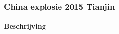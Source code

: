 \documentclass{article}
\begin{document}
	
	\subsubsection{China explosie 2015 Tianjin}
	\paragraph{Beschrijving}
	
\end{document}
